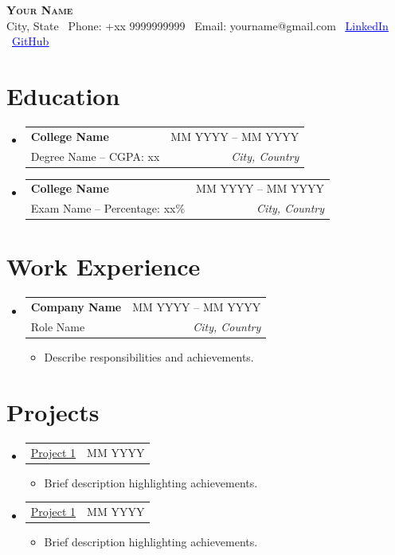 \documentclass[letterpaper,11pt]{article}
\makeatletter
\newcommand{\resumeItem}[1]{
  \vspace{-5pt}
  \item \small{#1}
  \vspace{-10pt}
}
\newcommand{\resumeSubheading}[4]{
  \vspace{-2pt}\item
  \begin{tabular*}{\textwidth}[t]{l@{\extracolsep{\fill}}r}
    \textbf{#1} & {#2} \\
    {#3} & \textit{#4} \\
  \end{tabular*}\vspace{-7pt}
}
\newcommand{\resumeProjectHeading}[2]{
  \item
  \begin{tabular*}{\textwidth}{l@{\extracolsep{\fill}}r}
    \small #1 & { #2} \\
  \end{tabular*}\vspace{-7pt}
}
\newcommand{\resumeSubHeadingListStart}{\begin{itemize}[leftmargin=0in, label={}]}
\newcommand{\resumeSubHeadingListEnd}{\end{itemize}}
\newcommand{\resumeItemListStart}{\begin{itemize}}
\newcommand{\resumeItemListEnd}{\end{itemize}\vspace{-5pt}}
\makeatother
\begin{document}
\begin{center}
{\Huge \textbf{\scshape Your Name}} \\[4pt]

City, State \textbar\
Phone: +xx 9999999999 \textbar\
Email: yourname@gmail.com \textbar\
\href{https://linkedin.com/in/yourid}{\textcolor{blue}{\underline{LinkedIn}}} \textbar\ 
\href{https://github.com/yourid}{\textcolor{blue}{\underline{GitHub}}}
\end{center}


\section{Education}
\resumeSubHeadingListStart

\resumeSubheading
{College Name}{MM YYYY -- MM YYYY}
{Degree Name -- CGPA: xx}{City, Country}

\resumeSubheading
{College Name}{MM YYYY -- MM YYYY}
{Exam Name -- Percentage: xx\%}{City, Country}

\resumeSubHeadingListEnd

\section{Work Experience}
\resumeSubHeadingListStart

\resumeSubheading
{Company Name}{MM YYYY -- MM YYYY}
{Role Name}{City, Country}

\resumeItemListStart
\resumeItem{Describe responsibilities and achievements.}
\resumeItemListEnd

\resumeSubHeadingListEnd

\section{Projects}
\resumeSubHeadingListStart

\resumeProjectHeading
{\href{https://github.com/project}{{\underline{Project 1}}}}{MM YYYY}

\resumeItemListStart
\resumeItem{Brief description highlighting achievements.}
\resumeItemListEnd

\resumeProjectHeading
{\href{https://github.com/project}{{\underline{Project 1}}}}{MM YYYY}

\resumeItemListStart
\resumeItem{Brief description highlighting achievements.}
\resumeItemListEnd


\resumeSubHeadingListEnd

\end{document}
